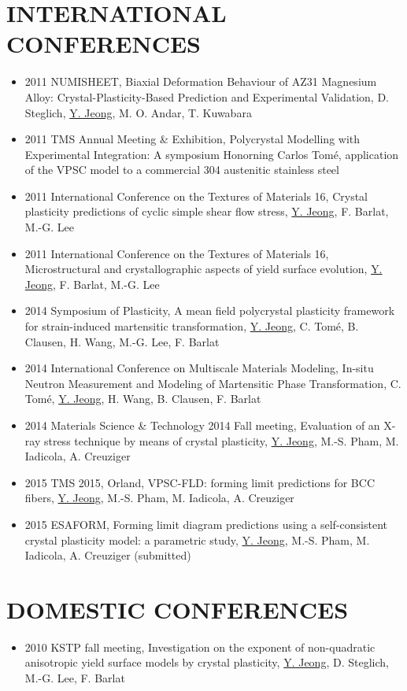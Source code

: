 \documentclass{res}
\begin{document}
\begin{resume}
  \section{INTERNATIONAL CONFERENCES}
  \begin{itemize}
  \item 2011 NUMISHEET, Biaxial Deformation Behaviour of AZ31 Magnesium Alloy: Crystal-Plasticity-Based Prediction and Experimental Validation, D. Steglich, \underline{Y. Jeong}, M. O. Andar, T. Kuwabara
  \item 2011 TMS Annual Meeting \& Exhibition, Polycrystal Modelling with Experimental Integration: A symposium Honorning Carlos Tom\'e, application of the VPSC model to a commercial 304 austenitic stainless steel
  \item 2011 International Conference on the Textures of Materials 16, Crystal plasticity predictions of cyclic simple shear flow stress, \underline{Y. Jeong}, F. Barlat, M.-G. Lee
  \item 2011 International Conference on the Textures of Materials 16, Microstructural and crystallographic aspects of yield surface evolution, \underline{Y. Jeong}, F. Barlat, M.-G. Lee
  \item 2014 Symposium of Plasticity, A mean field polycrystal plasticity framework for strain-induced martensitic transformation, \underline{Y. Jeong}, C. Tom\'{e}, B. Clausen, H. Wang, M.-G. Lee, F. Barlat
  \item 2014 International Conference on Multiscale Materials Modeling, In-situ Neutron  Measurement and Modeling of Martensitic Phase Transformation, C. Tom\'{e}, \underline{Y. Jeong}, H. Wang, B. Clausen, F. Barlat
  \item 2014 Materials Science \& Technology 2014 Fall meeting, Evaluation of an X-ray stress technique by means of crystal plasticity, \underline{Y. Jeong}, M.-S. Pham, M. Iadicola, A. Creuziger
  \item 2015 TMS 2015, Orland, VPSC-FLD: forming limit predictions for BCC fibers, \underline{Y. Jeong}, M.-S. Pham, M. Iadicola, A. Creuziger
  \item 2015 ESAFORM, Forming limit diagram predictions using a self-consistent crystal plasticity model: a parametric study, \underline{Y. Jeong}, M.-S. Pham, M. Iadicola, A. Creuziger (submitted)
  \end{itemize}    

  \section{DOMESTIC CONFERENCES}
  \begin{itemize}
  \item 2010 KSTP fall meeting, Investigation on the exponent of non-quadratic anisotropic yield surface models by crystal plasticity, \underline{Y. Jeong}, D. Steglich, M.-G. Lee, F. Barlat
  \end{itemize}
  

\end{resume}
\end{document}
